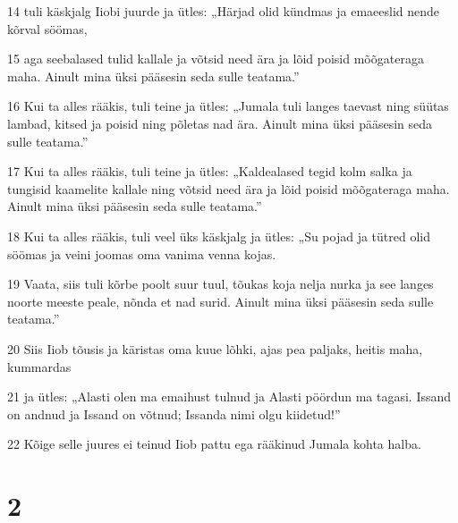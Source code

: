 \par 14 tuli käskjalg Iiobi juurde ja ütles: „Härjad olid kündmas ja emaeeslid nende kõrval söömas,
\par 15 aga seebalased tulid kallale ja võtsid need ära ja lõid poisid mõõgateraga maha. Ainult mina üksi pääsesin seda sulle teatama.”
\par 16 Kui ta alles rääkis, tuli teine ja ütles: „Jumala tuli langes taevast ning süütas lambad, kitsed ja poisid ning põletas nad ära. Ainult mina üksi pääsesin seda sulle teatama.”
\par 17 Kui ta alles rääkis, tuli teine ja ütles: „Kaldealased tegid kolm salka ja tungisid kaamelite kallale ning võtsid need ära ja lõid poisid mõõgateraga maha. Ainult mina üksi pääsesin seda sulle teatama.”
\par 18 Kui ta alles rääkis, tuli veel üks käskjalg ja ütles: „Su pojad ja tütred olid söömas ja veini joomas oma vanima venna kojas.
\par 19 Vaata, siis tuli kõrbe poolt suur tuul, tõukas koja nelja nurka ja see langes noorte meeste peale, nõnda et nad surid. Ainult mina üksi pääsesin seda sulle teatama.”
\par 20 Siis Iiob tõusis ja käristas oma kuue lõhki, ajas pea paljaks, heitis maha, kummardas
\par 21 ja ütles: „Alasti olen ma emaihust tulnud ja Alasti pöördun ma tagasi. Issand on andnud ja Issand on võtnud; Issanda nimi olgu kiidetud!”
\par 22 Kõige selle juures ei teinud Iiob pattu ega rääkinud Jumala kohta halba.

\chapter{2}

